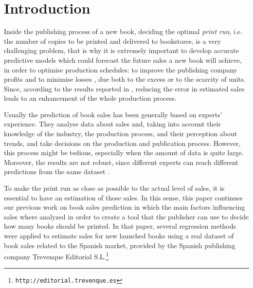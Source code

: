\documentclass[a4paper,10pt,onecolumn,preprint,3p]{elsarticle}
\begin{document}
\section{Introduction}
\label{sec:intro}


Inside the publishing process of a new book, deciding the optimal {\em
  print run}, i.e. the number of copies to be printed and delivered to
bookstores, is a very challenging problem, that is why it is extremely
important to develop accurate predictive models which could forecast
the future sales a new book will achieve, in order to optimise
production schedules: to improve the publishing company profits and to
minimise losses \cite{Zhao2001}, due both to the excess or to the
scarcity of units. 
Since, according to the results reported in \cite{Fildes2010,Saeed2008}, reducing the error in estimated sales leads to an enhancement of the whole production process.

Usually the prediction of book sales has been generally based on experts' experience. They analyse data about sales and, taking into account their knowledge of the industry, the production process, and their perception about trends, and take decisions on the production and publication process.
However, this process might be tedious, especially when the amount of data is 
quite large. Moreover, the results are not robust, since different experts can reach different predictions from the same dataset \cite{Sanders1994}.


To make the print run as close as possible to the actual level of sales, it is 
essential to have an estimation of those sales. 
In this sense, this paper continues our previous work on book sales prediction 
\cite{Castillo2016books} in which the main factors influencing sales where 
analyzed in order to create a tool that the publisher can use to decide how many 
books should be printed.
In that paper, several regression methods were applied to estimate sales for new launched books using a real dataset of book sales related to the Spanish market, provided by the Spanish publishing company Trevenque Editorial S.L.\footnote{\tt http://editorial.trevenque.es}
\end{document}
